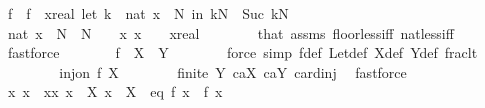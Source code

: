 \begin{isabellebody}
\ f\ \ {\isachardoublequoteopen}f\ {\isasymequiv}\ {\isasymlambda}x{\isacharcolon}{\kern0pt}{\isacharcolon}{\kern0pt}real{\isachardot}{\kern0pt}\ let\ k\ {\isacharequal}{\kern0pt}\ nat\ {\isasymlfloor}x\ {\isacharasterisk}{\kern0pt}\ N{\isasymrfloor}\ in\ {\isacharbraceleft}{\kern0pt}k{\isacharslash}{\kern0pt}N\ {\isachardot}{\kern0pt}{\isachardot}{\kern0pt}{\isacharless}{\kern0pt}\ Suc\ k{\isacharslash}{\kern0pt}N{\isacharbraceright}{\kern0pt}{\isachardoublequoteclose}\isanewline
\ \ \ \ \isamarkupfalse%
\ {\isachardoublequoteopen}nat\ {\isasymlfloor}x\ {\isacharasterisk}{\kern0pt}\ N{\isasymrfloor}\ {\isacharless}{\kern0pt}\ N{\isachardoublequoteclose}\ \ {\isachardoublequoteopen}{}\ {\isasymle}\ x{\isachardoublequoteclose}\ {\isachardoublequoteopen}x\ {\isacharless}{\kern0pt}\ {}{\isachardoublequoteclose}\ \ x{\isacharcolon}{\kern0pt}{\isacharcolon}{\kern0pt}real\isanewline
\ \ \ \ \ \ \isamarkupfalse%
\ that\ assms\ floor{\isacharunderscore}{\kern0pt}less{\isacharunderscore}{\kern0pt}iff\ nat{\isacharunderscore}{\kern0pt}less{\isacharunderscore}{\kern0pt}iff\ \isamarkupfalse%
\ fastforce\isanewline
\ \ \ \ \isamarkupfalse%
\ \isamarkupfalse%
\ {\isachardoublequoteopen}f\ {\isasymin}\ X\ {\isasymrightarrow}\ Y{\isachardoublequoteclose}\isanewline
\ \ \ \ \ \ \isamarkupfalse%
\ {\isacharparenleft}{\kern0pt}force\ simp{\isacharcolon}{\kern0pt}\ f{\isacharunderscore}{\kern0pt}def\ Let{\isacharunderscore}{\kern0pt}def\ X{\isacharunderscore}{\kern0pt}def\ Y{\isacharunderscore}{\kern0pt}def\ frac{\isacharunderscore}{\kern0pt}lt{\isacharunderscore}{\kern0pt}{}{\isacharparenright}{\kern0pt}\isanewline
\ \ \ \ \isamarkupfalse%
\ \isamarkupfalse%
\ {\isachardoublequoteopen}{\isasymnot}\ inj{\isacharunderscore}{\kern0pt}on\ f\ X{\isachardoublequoteclose}\isanewline
\ \ \ \ \ \ \isamarkupfalse%
\ {\isacartoucheopen}finite\ Y{\isacartoucheclose}\ caX\ caY\ card{\isacharunderscore}{\kern0pt}inj\ \isamarkupfalse%
\ fastforce\isanewline
\ \ \ \ \isamarkupfalse%
\ \isamarkupfalse%
\ x\ x{\isacharprime}{\kern0pt}\ \ {\isachardoublequoteopen}x{\isasymnoteq}x{\isacharprime}{\kern0pt}{\isachardoublequoteclose}\ {\isachardoublequoteopen}x\ {\isasymin}\ X{\isachardoublequoteclose}\ {\isachardoublequoteopen}x{\isacharprime}{\kern0pt}\ {\isasymin}\ X{\isachardoublequoteclose}\ \ eq{\isacharcolon}{\kern0pt}\ {\isachardoublequoteopen}f\ x\ {\isacharequal}{\kern0pt}\ f\ x{\isacharprime}{\kern0pt}{\isachardoublequoteclose}\isanewline

\end{isabellebody}

